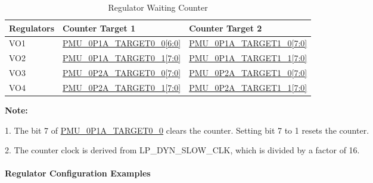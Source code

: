 \documentclass[main\_\_EN.tex]{subfiles}
\begin{document}
\begin{itemize}
    \begin{table}[H]
    \small
    \centering
    \caption{Regulator Waiting Counter}
    \label{tab:lowpowm-target}
    \begin{threeparttable}
    \begin{tabular}{|l|l|l|}
    \hline
    \rowcolor{lightgray}
    Regulators & Counter Target 1 & Counter Target 2\\\hline

    VO1	& \hyperref[fielddesc:PMU0P1ATARGET00]{PMU\_0P1A\_TARGET0\_0[6:0]} & \hyperref[fielddesc:PMU0P1ATARGET10]{PMU\_0P1A\_TARGET1\_0[7:0]}\\\hline

    VO2	& \hyperref[fielddesc:PMU0P1ATARGET01]{PMU\_0P1A\_TARGET0\_1[7:0]} & \hyperref[fielddesc:PMU0P1ATARGET11]{PMU\_0P1A\_TARGET1\_1[7:0]}\\\hline

    VO3	& \hyperref[fielddesc:PMU0P2ATARGET00]{PMU\_0P2A\_TARGET0\_0[7:0]} & \hyperref[fielddesc:PMU0P2ATARGET10]{PMU\_0P2A\_TARGET1\_0[7:0]}\\\hline

    VO4	& \hyperref[fielddesc:PMU0P2ATARGET01]{PMU\_0P2A\_TARGET0\_1[7:0]} & \hyperref[fielddesc:PMU0P2ATARGET11]{PMU\_0P2A\_TARGET1\_1[7:0]}\\\hline
    \end{tabular}
    \end{threeparttable}
    \end{table}

    \textbf{Note:}

    1. The bit 7 of \hyperref[fielddesc:PMU0P1ATARGET00]{PMU\_0P1A\_TARGET0\_0} clears the counter. Setting bit 7 to 1 resets the counter.

    2. The counter clock is derived from LP\_DYN\_SLOW\_CLK, which is divided by a factor of 16.

    \paragraph{Regulator Configuration Examples}


\end{itemize}
\end{document}
